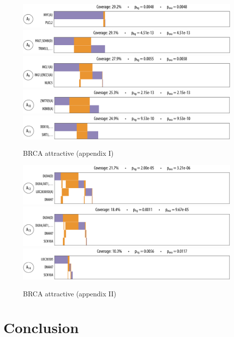 \begin{figure}[htbp]
\centering
\includegraphics[width=\textwidth]{figures/genes/brca_9_a.pdf}\\[2em]
\includegraphics[width=\textwidth]{figures/genes/brca_13_a.pdf}\\[2em]
\includegraphics[width=\textwidth]{figures/genes/brca_5_a.pdf}\\[2em]
\includegraphics[width=\textwidth]{figures/genes/brca_10_a.pdf}\\[2em]
\includegraphics[width=\textwidth]{figures/genes/brca_12_a.pdf}\\[2em]
\caption{BRCA attractive (appendix I)}
\end{figure}

\begin{figure}[htbp]
\centering
\includegraphics[width=\textwidth]{figures/genes/brca_3_a.pdf}\\[2em]
\includegraphics[width=\textwidth]{figures/genes/brca_2_a.pdf}\\[2em]
\includegraphics[width=\textwidth]{figures/genes/brca_6_a.pdf}\\[2em]
\caption{BRCA attractive (appendix II)}
\end{figure}

\section{Conclusion}
